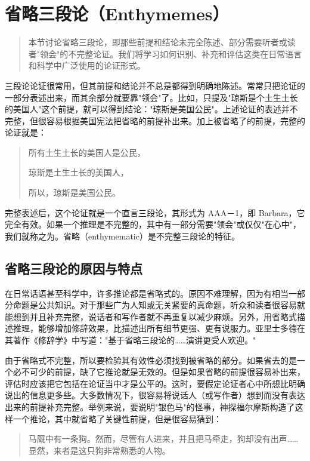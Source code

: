\section{省略三段论（Enthymemes）}

\begin{quotation}
本节讨论省略三段论，即那些前提和结论未完全陈述、部分需要听者或读者"领会"的不完整论证。我们将学习如何识别、补充和评估这类在日常语言和科学中广泛使用的论证形式。
\end{quotation}

三段论论证很常用，但其前提和结论并不总是都得到明确地陈述。常常只把论证的一部分表述出来，而其余部分就要靠"领会"了。比如，只提及"琼斯是个土生土长的美国人"这个前提，就可以得到结论："琼斯是美国公民"。上述论证的表述并不完整，但很容易根据美国宪法把省略的前提补出来。加上被省略了的前提，完整的论证就是：

\begin{quote}
所有土生土长的美国人是公民，

琼斯是土生土长的美国人，

所以，琼斯是美国公民。
\end{quote}

完整表述后，这个论证就是一个直言三段论，其形式为 AAA－1，即 Barbara，它完全有效。如果一个推理是不完整的，其中有一部分需要"领会"或仅仅"在心中"，我们就称之为。省略（enthymematic）是不完整三段论的特征。

\subsection{省略三段论的原因与特点}

在日常话语甚至科学中，许多推论都是省略式的。原因不难理解，因为有相当一部分命题是公共知识。对于那些广为人知或无关紧要的真命题，听众和读者很容易就能想到并且补充完整，说话者和写作者就不再重复以减少麻烦。另外，用省略式描述推理，能够增加修辞效果，比描述出所有细节更强、更有说服力。亚里士多德在其著作《修辞学》中写道："基于省略三段论的……演讲更受人欢迎。"

由于省略式不完整，所以要检验其有效性必须找到被省略的部分。如果省去的是一个必不可少的前提，缺了它推论就是无效的。但是如果省略的前提很容易补出来，评估时应该把它包括在论证当中才是公平的。这时，要假定论证者心中所想比明确说出的信息更多些。大多数情况下，很容易将说话人（或写作者）想到而没有表达出来的前提补充完整。举例来说，要说明"银色马"的怪事，神探福尔摩斯构造了这样一个推论，其中就省略了关键性前提，但是很容易猜到：

\begin{quote}
马厩中有一条狗。然而，尽管有人进来，并且把马牵走，狗却没有出声……显然，来者是这只狗非常熟悉的人物。
\end{quote}

